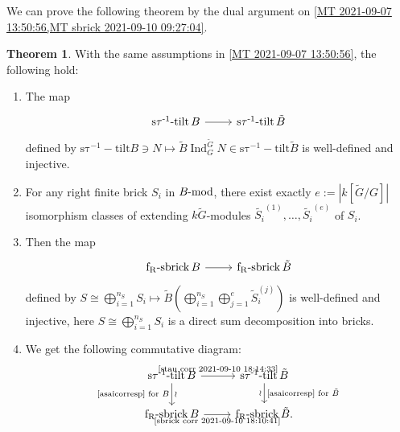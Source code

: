 \documentclass[pdftex,a4paper]{article}
\numberwithin{equation}{subsection}
\theoremstyle{definition}
\newtheorem{theorem}{Theorem}[section]
\newcommand{\lmod}{\operatorname{\mathrm{\hspace{-2pt}-mod}}}
\newcommand{\induc}{{\operatorname{Ind}\nolimits}}
\newcommand{\stauitilt}{\operatorname{\mathrm{s\tau^{-1}-tilt}}}
\newcommand{\frsbrick}{\operatorname{\mathrm{f_R-sbrick}}}
\begin{document}
We can prove the following theorem by the dual argument on \cref{MT 2021-09-07 13:50:56,MT sbrick 2021-09-10 09:27:04}.
\begin{theorem}\label{MT sbrick 2021-09-10 18:03:52}
	With the same assumptions in \cref{MT 2021-09-07 13:50:56}, the following hold:
	\begin{enumerate}
		\item The map
		      \begin{equation}\label{stau corr 2021-09-10 18:14:33}
			      \begin{tikzcd}[ampersand replacement=\&,row sep=1pt]
				      \stauitilt B \ar[r]\&\stauitilt \tilde{B}\\
			      \end{tikzcd}
		      \end{equation}
		      defined by \(\stauitilt B\ni N\mapsto \tilde{B}\induc_G^{\tilde{G}} N \in \stauitilt \tilde{B}\) is well-defined and injective.
		\item For any right finite brick \(S_i\) in \(B\lmod\), there exist exactly \(e:=|k[\tilde{G}/G]|\) isomorphism classes of extending \(k\tilde{G}\)-modules \(\tilde{S_i}^{(1)}, \ldots, \tilde{S_i}^{(e)}\) of \(S_i\).
		\item Then the map
		      \begin{equation}\label{sbrick corr 2021-09-10 18:10:41}
			      \begin{tikzcd}[ampersand replacement=\&,row sep=1pt]
				      \frsbrick B \ar[r]\&\frsbrick \tilde{B}\\
			      \end{tikzcd}
		      \end{equation}
		      defined by \(S\cong \bigoplus_{i=1}^{n_{S}}S_i\mapsto \tilde{B}\left( \bigoplus_{i=1}^{n_S}\bigoplus_{j=1}^{e}\tilde{S}_i^{(j)} \right)\) is well-defined and injective, here \(S\cong \bigoplus_{i=1}^{n_{S}}S_i\) is a direct sum decomposition into bricks.
		\item We get the following  commutative diagram:
		      \begin{equation}
			      \begin{tikzcd}[ampersand replacement=\&]
				      \stauitilt B\ar[d,"\text{\eqref{asaicorresp} for \(B\)}"',"\wr"] \ar[r,"\text{\eqref{stau corr 2021-09-10 18:14:33}}"]\&\stauitilt \tilde{B} \ar[d,"\text{\eqref{asaicorresp} for \(\tilde{B}\)}","\wr"']\\
				      \frsbrick B\ar[r,"\text{\eqref{sbrick corr 2021-09-10 18:10:41}}"']\&\frsbrick \tilde{B}.
			      \end{tikzcd}
		      \end{equation}
	\end{enumerate}
\end{theorem}
\end{document}
